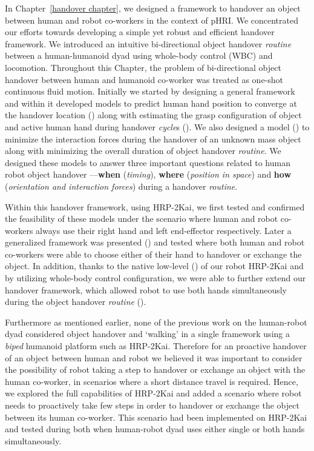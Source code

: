 In Chapter~\ref{handover chapter}, we designed a framework to handover an object between human and robot co-workers in the context of pHRI. We concentrated our efforts towards developing a simple yet robust and efficient handover framework. We introduced an intuitive bi-directional object handover \textit{routine} between a human-humanoid dyad using whole-body control (WBC) and locomotion. Throughout this Chapter, the problem of bi-directional object handover between human and humanoid co-worker was treated as one-shot continuous fluid motion. Initially we started by designing a general framework and within it developed models to predict human hand position to converge at the handover location () along with estimating the grasp configuration of object and active human hand during handover \textit{cycle}s (). We also designed a model () to minimize the interaction forces during the handover of an unknown mass object along with minimizing the overall duration of object handover \textit{routine}. We designed these models to answer three important questions related to human robot object handover ---\textbf{when} (\textit{timing}), \textbf{where} (\textit{position in space}) and \textbf{how} (\textit{orientation and interaction forces}) during a handover \textit{routine}. 
 
Within this handover framework, using HRP-2Kai, we first tested and confirmed the feasibility of these models under the scenario where human and robot co-workers always use their right hand and left end-effector respectively. Later a generalized framework was presented () and tested where both human and robot co-workers were able to choose either of their hand to handover or exchange the object. In addition, thanks to the native low-level () of our robot HRP-2Kai and by utilizing whole-body control configuration, we were able to further extend our handover framework, which allowed robot to use both hands simultaneously during the object handover \textit{routine} (). 

Furthermore as mentioned earlier, none of the previous work on the human-robot dyad considered object handover and `walking' in a single framework using a \textit{biped} humanoid platform such as HRP-2Kai. Therefore for an proactive handover of an object between human and robot we believed it was important to consider the possibility of robot taking a step to handover or exchange an object with the human co-worker, in scenarios where a short distance travel is required. Hence, we explored the full capabilities of HRP-2Kai and added a scenario where robot needs to proactively take few steps in order to handover or exchange the object between its human co-worker. This scenario had been implemented on HRP-2Kai and tested during both when human-robot dyad uses either single or both hands simultaneously. 
 
